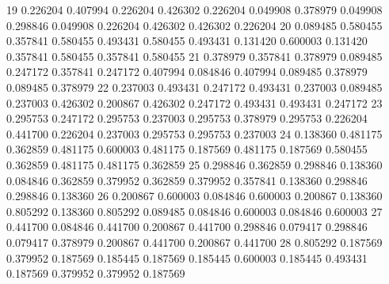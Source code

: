{   19    0.226204     0.407994    0.226204    0.426302              0.226204             0.049908           0.378979             0.049908                0.298846                0.049908               0.226204              0.426302               0.426302                0.226204
   20    0.089485     0.580455    0.357841    0.580455              0.493431             0.580455           0.493431             0.131420                0.600003                0.131420               0.357841              0.580455               0.357841                0.580455
   21    0.378979     0.357841    0.378979    0.089485              0.247172             0.357841           0.247172             0.407994                0.084846                0.407994               0.089485              0.378979               0.089485                0.378979
   22    0.237003     0.493431    0.247172    0.493431              0.237003             0.089485           0.237003             0.426302                0.200867                0.426302               0.247172              0.493431               0.493431                0.247172
   23    0.295753     0.247172    0.295753    0.237003              0.295753             0.378979           0.295753             0.226204                0.441700                0.226204               0.237003              0.295753               0.295753                0.237003
   24    0.138360     0.481175    0.362859    0.481175              0.600003             0.481175           0.187569             0.481175                0.187569                0.580455               0.362859              0.481175               0.481175                0.362859
   25    0.298846     0.362859    0.298846    0.138360              0.084846             0.362859           0.379952             0.362859                0.379952                0.357841               0.138360              0.298846               0.298846                0.138360
   26    0.200867     0.600003    0.084846    0.600003              0.200867             0.138360           0.805292             0.138360                0.805292                0.089485               0.084846              0.600003               0.084846                0.600003
   27    0.441700     0.084846    0.441700    0.200867              0.441700             0.298846           0.079417             0.298846                0.079417                0.378979               0.200867              0.441700               0.200867                0.441700
   28    0.805292     0.187569    0.379952    0.187569              0.185445             0.187569           0.185445             0.600003                0.185445                0.493431               0.187569              0.379952               0.379952                0.187569
}
